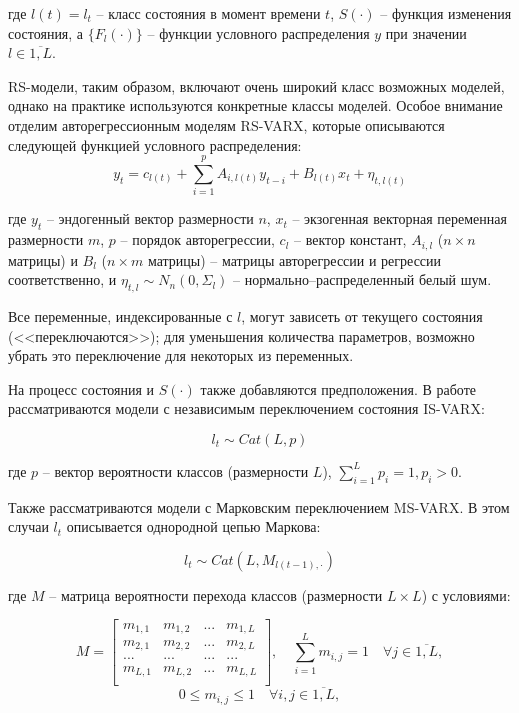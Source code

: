 \documentclass[a4paper,14pt]{extreport}
\begin{document}
где $l(t) = l_t$ -- класс состояния в момент времени $t$, $S(\cdot)$ -- функция изменения состояния, а $\{F_l(\cdot)\}$ -- функции условного распределения $y$ при значении $l \in \overline{1,L}$. 

RS-модели, таким образом, включают очень широкий класс возможных моделей, однако на практике используются конкретные классы моделей. Особое внимание отделим авторегрессионным моделям RS-VARX, которые описываются следующей функцией условного распределения:
\[
	y_{t}=c_{l(t)} + \sum_{i=1}^{p} A_{i,l(t)} y_{t-i} + B_{l(t)} x_{t} + \eta_{t, l(t)} 
\]

где 
$y_t$ -- эндогенный вектор размерности $n$, 
$x_{t}$ -- экзогенная векторная переменная размерности $m$,
$p$ -- порядок авторегрессии, 
$c_{l}$ -- вектор констант,
$A_{i,l}$ ($n \times n$ матрицы) и $B_{l}$ ($n \times m$ матрицы) -- матрицы авторегрессии и регрессии соответственно,
и $\eta_{t, l} \sim N_n(0, \Sigma_{l}) $ -- нормально–распределенный белый шум.

Все переменные, индексированные с $l$, могут зависеть от текущего состояния (<<переключаются>>); для уменьшения количества параметров, возможно убрать это переключение для некоторых из переменных.


На процесс состояния и $S(\cdot)$ также добавляются предположения. В работе рассматриваются модели с независимым переключением состояния IS-VARX:

\[ 
	l_t \sim \mathit{Cat}(L, p) 
\]

где $p$ -- вектор вероятности классов (размерности $L$), $\sum_{i=1}^{L}{p_i} = 1, p_i > 0$.

Также рассматриваются модели с Марковским переключением MS-VARX. 
В этом случаи $l_t$ описывается однородной цепью Маркова:

\[
	l_t \sim \mathit{Cat}(L, M_{l(t-1), \cdot})
\]

где $M$ -- матрица вероятности перехода классов (размерности $L \times L$) с условиями:

\[
	M=
	\left[ {\begin{array}{cccc}
			m_{1,1} & m_{1,2} & ... & m_{1,L} \\
			m_{2,1} & m_{2,2} & ... & m_{2,L} \\
			... & ... & ... & ... \\
			m_{L,1} & m_{L,2} & ... & m_{L,L} \\
		\end{array} } \right]
	, \quad
	\sum_{i=1}^{L} m_{i,j} = 1 \quad \forall j \in \overline{1,L}
	,
\]
\[
	0 \le m_{i,j} \le 1 \quad \forall i, j \in \overline{1,L},
\]
\end{document}
